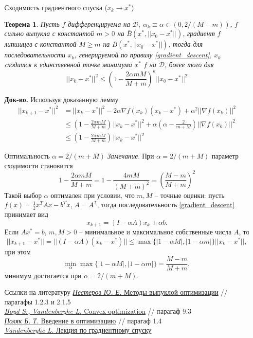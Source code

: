 \documentclass[10pt]{beamer}
\newtheorem{theorem_ru}{Теорема}[]
\begin{document}
\begin{frame}{Сходимость градиентного спуска ($x_k\rightarrow x^*$)}
\begin{theorem_ru}
Пусть $f$ дифференцируема на $\mathcal{D}$, $\alpha_k\equiv \alpha\in (0, 2/(M+m))$, $f$ сильно выпукла с константой $m>0$ на 
$\bar{B}(x^*, ||x_0-x^*||)$, градиент $f$ липшицев с константой $M\geq m$ на $\bar{B}(x^*, ||x_0-x^*||)$, тогда для последовательности $x_k$, генерируемой по правилу \eqref{gradient_descent},
$x_k$ cходится к единственной точке минимума $x^*$ $f$ на $\mathcal{D}$, более того для 
$$
||x_k-x^*||^2\leq \left(1-\frac{2\alpha mM}{M+m}\right)^k||x_0-x^*||^2
$$
\end{theorem_ru}
\pause
\textbf{Док-во.} Используя доказанную лемму
\begin{align*}
||x_{k+1}-x^*||^2&=||x_k-x^*||^2-2\alpha\nabla f(x_k)(x_k-x^*)+\alpha^2||\nabla f(x_k)||^2\\
&\leq \left(1-\frac{2\alpha mM}{M+m}\right)||x_k-x^*||^2+\alpha\left(\alpha-\frac{2}{m+M}\right)||\nabla f(x_k)||^2\\
&\leq \left(1-\frac{2\alpha mM}{M+m}\right)||x_k-x^*||^2
\end{align*}
\end{frame}

\begin{frame}{Оптимальность $\alpha=2/(m+M)$}
\textit{Замечание}. При $\alpha=2/(m+M)$ параметр сходимости становится
$$
1-\frac{2\alpha mM}{M+m}=1-\frac{4 mM}{(M+m)^2}=\left(\frac{M-m}{M+m}\right)^2
$$
\pause
Такой выбор $\alpha$ оптимален при условии, что $m, M$ -- точные оценки: пусть $f(x)=\frac{1}{2}x^TAx-b^Tx$, $A=A^T$, тогда 
последовательность \eqref{gradient_descent} принимает вид
$$
x_{k+1}=(I-\alpha A)x_k+\alpha b.
$$
\pause
Если  $Ax^*=b$, $m, M>0$ -- минимальное и максимальное собственные числа $A$, то
$$
||x_{k+1}-x^*||=||(I-\alpha A)(x_k-x^*)||\leq \max\{|1-\alpha M|, |1-\alpha m|\} ||x_k-x^*||,
$$
при этом
$$
 \min_\alpha\max\{|1-\alpha M|, |1-\alpha m|\}=\frac{M-m}{M+m},
$$
минимум достигается при $\alpha=2/(m+M)$.


\end{frame}

\begin{frame}{Ссылки на литературу}
\href{http://premolab.ru/pub_files/pub5/MnexoB89z7.pdf}{\textit{Нестеров Ю. Е.} Методы выпуклой оптимизации} // парагафы 1.2.3 и 2.1.5 \\
\vspace{1em}
\href{https://web.stanford.edu/~boyd/cvxbook/bv_cvxbook.pdf}{\textit{Boyd S., Vandenberghe L.} Convex optimization} // парагаф 9.3\\
\vspace{1em}
\href{http://lab7.ipu.ru/files/polyak/polyak-optimizationintro.pdf}{\textit{Поляк Б. Т.} Введение в оптимизацию} // парагаф 1.4\\
\vspace{1em}
\href{http://www.seas.ucla.edu/~vandenbe/236C/lectures/gradient.pdf}{\textit{Vandenberghe L.} Лекция по градиентному спуску} 

\end{frame}
\end{document}
